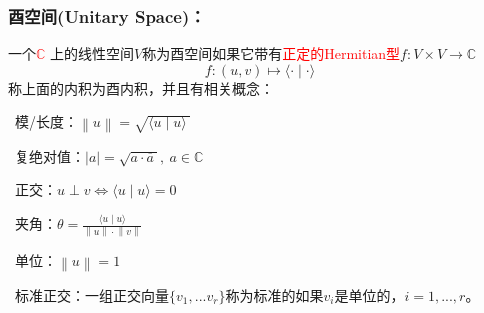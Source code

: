 \documentclass[zihao=-4,UTF8]{report}
\theoremstyle{mystyle} %
\begin{document}
\subsubsection{酉空间(Unitary Space)：}
一个\textcolor{red}{$\mathbb{C}$} 上的线性空间$V$称为酉空间如果它带有\textcolor{red}{正定的Hermitian型}$f:V\times V \longrightarrow \mathbb{C}$
\begin{equation*}
    f: (u,v) \longmapsto \langle \cdot \mid \cdot \rangle 
\end{equation*}
称上面的内积为酉内积，并且有相关概念：\par
{}\ 模/长度：$\left \| u \right \|  = \sqrt{\langle u\mid u \rangle\ }$\par
{}\ 复绝对值：$|a| = \sqrt{a\cdot\overline{a}\ },\ a \in \mathbb{C}$\par
{}\ 正交：$u \perp v \Longleftrightarrow \langle u\mid u \rangle = 0$\par
{}\ 夹角：$\theta = \frac{\langle u\mid u \rangle}{ \left \| u \right \|\cdot  \left \| v \right \|}$ \par
{}\ 单位：$ \left \| u \right \|= 1$\par
{}\ 标准正交：一组正交向量$\{v_1,...v_r\}$称为标准的如果$v_i$是单位的，$i = 1,...,r$。
\end{document}
